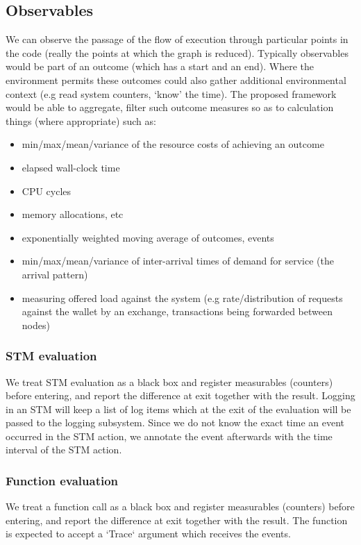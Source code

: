 

\subsection{Observables}

We can observe the passage of the flow of execution through particular points
in the code (really the points at which the graph is reduced). Typically
observables would be part of an outcome (which has a start and an end). Where
the environment permits these outcomes could also gather additional
environmental context (e.g read system counters, ‘know’ the time).
The proposed framework would be able to aggregate, filter such outcome measures
so as to calculation things (where appropriate) such as:
\\
\begin{itemize}
\item min/max/mean/variance of the resource costs of achieving an outcome
\item elapsed wall-clock time
\item CPU cycles
\item memory allocations, etc
\item exponentially weighted moving average of outcomes, events
\item min/max/mean/variance of inter-arrival times of demand for service (the arrival pattern)
\item measuring offered load against the system (e.g rate/distribution of requests against the wallet by an exchange, transactions being forwarded between nodes)
\end{itemize}

\subsubsection{STM evaluation} We treat STM evaluation as a black box and
register measurables (counters) before entering, and report the difference at
exit together with the result.
Logging in an STM will keep a list of log items which at the exit of the
evaluation will be passed to the logging subsystem. Since we do not know the
exact time an event occurred in the STM action, we annotate the event
afterwards with the time interval of the STM action.

\subsubsection{Function evaluation} We treat a function call as a black box and
register measurables (counters) before entering, and report the difference at
exit together with the result.
The function is expected to accept a `Trace` argument which receives the events.

